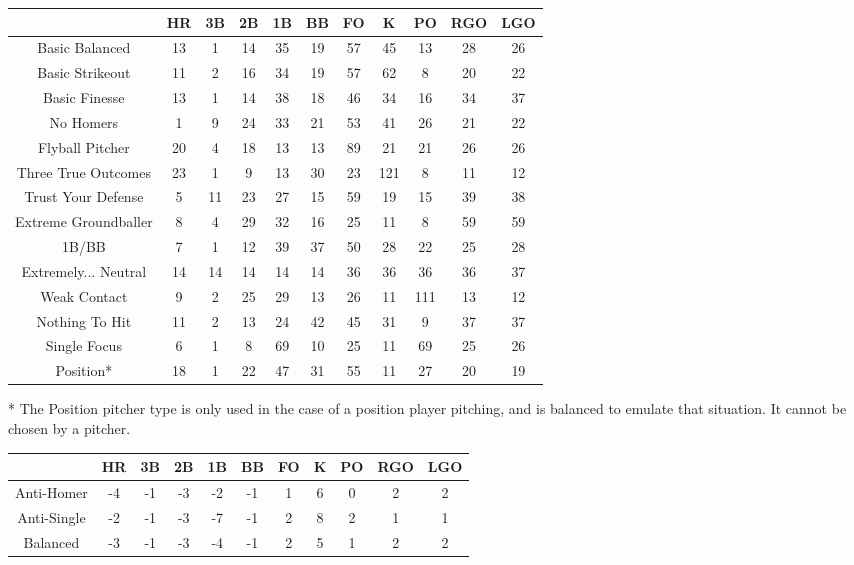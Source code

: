 \begin{center}
    \begin{tabular}{|c|c|c|c|c|c|c|c|c|c|c|}
		\hline
        & HR & 3B & 2B & 1B & BB & FO & K   & PO & RGO & LGO    \\
        \hline
Basic Balanced & 13 & 1 & 14 & 35 & 19 & 57 & 45 & 13 & 28 & 26 \\
\hline
Basic Strikeout & 11 & 2 & 16 & 34 & 19 & 57 & 62 & 8 & 20 & 22 \\
\hline
Basic Finesse & 13 & 1 & 14 & 38 & 18 & 46 & 34 & 16 & 34 & 37 \\
\hline
No Homers & 1 & 9 & 24 & 33 & 21 & 53 & 41 & 26 & 21 & 22 \\
\hline
Flyball Pitcher & 20 & 4 & 18 & 13 & 13 & 89 & 21 & 21 & 26 & 26 \\
\hline
Three True Outcomes & 23 & 1 & 9 & 13 & 30 & 23 & 121 & 8 & 11 & 12 \\
\hline
Trust Your Defense & 5 & 11 & 23 & 27 & 15 & 59 & 19 & 15 & 39 & 38 \\
\hline
Extreme Groundballer & 8 & 4 & 29 & 32 & 16 & 25 & 11 & 8 & 59 & 59 \\
\hline
1B/BB & 7 & 1 & 12 & 39 & 37 & 50 & 28 & 22 & 25 & 28 \\
\hline
Extremely... Neutral & 14 & 14 & 14 & 14 & 14 & 36 & 36 & 36 & 36 & 37 \\
\hline
Weak Contact & 9 & 2 & 25 & 29 & 13 & 26 & 11 & 111 & 13 & 12 \\
\hline
Nothing To Hit & 11 & 2 & 13 & 24 & 42 & 45 & 31 & 9 & 37 & 37 \\
\hline
Single Focus & 6 & 1 & 8 & 69 & 10 & 25 & 11 & 69 & 25 & 26 \\
\hline
Position* & 18 & 1 & 22 & 47 & 31 & 55 & 11 & 27 & 20 & 19 \\
\hline
    \end{tabular}
\end{center}

* The Position pitcher type is only used in the case of a position player pitching, 
and is balanced to emulate that situation. It cannot be chosen by a pitcher.

\begin{center}
    \begin{tabular}{|c|c|c|c|c|c|c|c|c|c|c|}
		\hline
        & HR & 3B & 2B & 1B & BB & FO & K   & PO & RGO & LGO    \\
        \hline
        Anti-Homer & -4 & -1 & -3 & -2 & -1 & 1 & 6 & 0 & 2 & 2 \\
        \hline 
        Anti-Single & -2 & -1 & -3 & -7 & -1 & 2 & 8 & 2 & 1 & 1 \\
        \hline
        Balanced & -3 & -1 & -3 & -4 & -1 & 2 & 5 & 1 & 2 & 2 \\
        \hline
    \end{tabular}
\end{center}